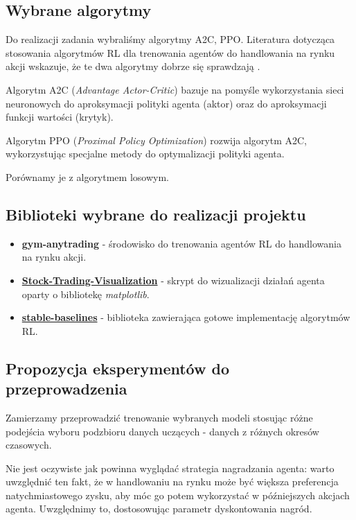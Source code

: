 \documentclass[12pt,a4paper]{article}
\begin{document}
\subsection{Wybrane algorytmy}

Do realizacji zadania wybraliśmy algorytmy A2C, PPO. Literatura dotycząca
stosowania algorytmów RL dla trenowania agentów do handlowania na rynku
akcji wskazuje, że te dwa algorytmy dobrze się sprawdzają
\cite{ensemble_strat}.

Algorytm A2C (\emph{Advantage Actor-Critic}) bazuje na pomyśle
wykorzystania sieci neuronowych do aproksymacji polityki agenta (aktor)
oraz do aproksymacji funkcji wartości (krytyk).

Algorytm PPO (\emph{Proximal Policy Optimization}) rozwija algorytm A2C, 
wykorzystując specjalne metody do optymalizacji polityki agenta.

\medskip

Porównamy je z algorytmem losowym.

\subsection{Biblioteki wybrane do realizacji projektu}

\begin{itemize}
  \item \textbf{gym-anytrading} - środowisko do trenowania agentów RL do
  handlowania na rynku akcji.
  \item \textbf{\href{https://github.com/notadamking/Stock-Trading-Visualization}{Stock-Trading-Visualization}} - 
  skrypt do wizualizacji działań agenta oparty o bibliotekę \emph{matplotlib}.
  \item \textbf{\href{https://github.com/DLR-RM/stable-baselines3}{stable-baselines}} -
  biblioteka zawierająca gotowe implementację algorytmów RL.
\end{itemize}

\subsection{Propozycja eksperymentów do przeprowadzenia}

Zamierzamy przeprowadzić trenowanie wybranych modeli stosując różne
podejścia wyboru podzbioru danych uczących - danych z różnych okresów
czasowych.

Nie jest oczywiste jak powinna wyglądać strategia nagradzania agenta:
warto uwzględnić ten fakt, że w handlowaniu na rynku może być większa
preferencja natychmiastowego zysku, aby móc go potem wykorzystać w 
późniejszych akcjach agenta. Uwzględnimy to, dostosowując parametr 
dyskontowania nagród.
\end{document}
